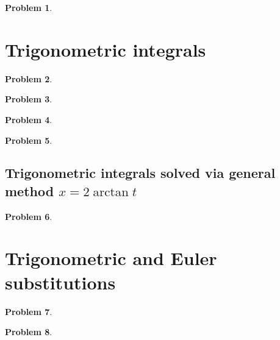 \documentclass{article}
\newtheorem{problem}{Problem}
\begin{document}
\begin{problem}

\end{problem}
\section{Trigonometric integrals}
\begin{problem}

\end{problem}

\begin{problem}

\end{problem}

\begin{problem}

\end{problem}

\begin{problem}

\end{problem}
\subsection{Trigonometric integrals solved via general method $x=2\arctan t$}
\begin{problem}

\end{problem}


\section{Trigonometric and Euler substitutions}
\begin{problem}

\end{problem}


\begin{problem}

\end{problem}

\end{document}

